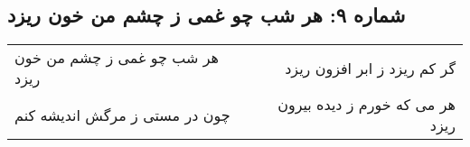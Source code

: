 \begin{center}
\section*{شماره ۹: هر شب چو غمی ز چشم من خون ریزد}
\label{sec:009}
\begin{longtable}{l p{0.5cm} r}
هر شب چو غمی ز چشم من خون ریزد
&&
گر کم ریزد ز ابر افزون ریزد
\\
چون در مستی ز مرگش اندیشه کنم
&&
هر می که خورم ز دیده بیرون ریزد
\\
\end{longtable}
\end{center}
